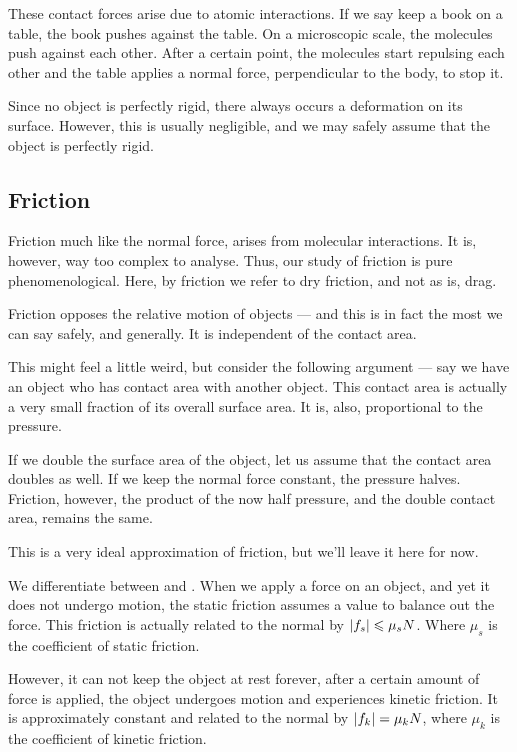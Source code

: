These contact forces arise due to atomic interactions. If we say keep a book on a table,
the book pushes against the table. On a microscopic scale, the molecules push against each other.
After a certain point, the molecules start repulsing each other and the table applies a normal force,
perpendicular to the body, to stop it. 

Since no object is perfectly rigid, there always occurs a deformation on its surface. However, 
this is usually negligible, and we may safely assume that the object is perfectly rigid. 

\subsection{Friction}

Friction much like the normal force, arises from molecular interactions.
It is, however, way too complex to analyse. Thus, our study of friction is 
pure phenomenological. Here, by friction we refer to dry friction, and not as is, drag. 

Friction opposes the relative motion of objects --- and this is in fact the most we 
can say safely, and generally. It is independent of the contact area.

This might feel a little weird, but consider the following argument --- say we have an object 
who has contact area with another object. This contact area is actually a very small fraction 
of its overall surface area. It is, also, proportional to the pressure.

If we double the surface area of the object, let us assume that the contact area doubles as well.
If we keep the normal force constant, the pressure halves. Friction, however, the 
product of the now half pressure, and the double contact area, remains the same.

This is a very ideal approximation of friction, but we'll leave it here for now. 

We differentiate between  and . When we apply 
a force on an object, and yet it does not undergo motion, the static friction assumes a value 
to balance out the force. This friction is actually related to the normal by \(\abs{f_s} \leqslant \mu_sN\).
Where \(\mu_s\) is the coefficient of static friction. 

However, it can not keep the object at rest forever, after a certain amount of force is applied, 
the object undergoes motion and experiences kinetic friction. It is approximately constant 
and related to the normal by \(\abs{f_k} = \mu_kN\), where \(\mu_k\) is the coefficient of kinetic friction.

